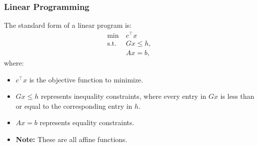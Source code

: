 \subsubsection{Linear Programming}
\begin{definition}
    The standard form of a linear program is:
    \[
    \begin{aligned}
        \min \ & c^\top x \\
        \text{s.t.} \ & Gx \leq h, \\
        & Ax = b,
    \end{aligned}
    \]
    where:
    \begin{itemize}
        \item \(c^\top x\) is the objective function to minimize.
        \item \(Gx \leq h\) represents inequality constraints, where every entry in \(Gx\) is less than or equal to the corresponding entry in \(h\). 
        \item \(Ax = b\) represents equality constraints.
        \item \textbf{Note:} These are all affine functions.
    \end{itemize}
\end{definition}

